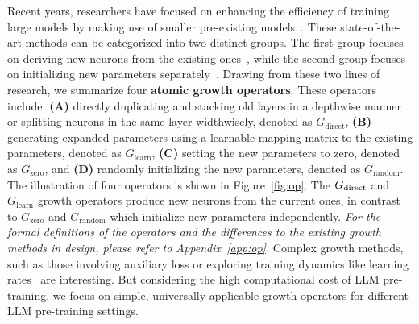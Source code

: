 \documentclass{article}
\begin{document}
Recent years, researchers have focused on enhancing the efficiency of training large models by making use of smaller pre-existing models~\cite{chen2015net2net, chen2021bert2bert, gong2019efficient, yang2020progressively, wang2023learning, wang2023lemon, shen2022staged, evci2022gradmax, yao2024masked}.
These state-of-the-art methods can be categorized into two distinct groups. The first group focuses on deriving new neurons from the existing ones~\cite{chen2015net2net, chen2021bert2bert, gong2019efficient, wang2023lemon, wang2023learning}, while the second group focuses on initializing new parameters separately~\cite{yang2020progressively, shen2022staged, evci2022gradmax, yao2024masked}.
Drawing from these two lines of research, we summarize four \textbf{atomic growth operators}. 
These operators include: \textbf{(A)} directly duplicating and stacking old layers in a depthwise manner or splitting neurons in the same layer widthwisely, denoted as $G_\text{direct}$, \textbf{(B)} generating expanded parameters using a learnable mapping matrix to the existing parameters, denoted as $G_{\text{learn}}$, \textbf{(C)} setting the new parameters to zero, denoted as $G_{\text{zero}}$, and \textbf{(D)} randomly initializing the new parameters, denoted as $G_{\text{random}}$. 
The illustration of four operators is shown in Figure~\ref{fig:op}. The $G_\text{\text{direct}}$ and $G_{\text{learn}}$ growth operators produce new neurons from the current ones, in contrast to $G_{\text{zero}}$ and $G_{\text{random}}$ which initialize new parameters independently.
\textit{For the formal definitions of the operators and the differences to the existing growth methods in design, please refer to Appendix~\ref{app:op}.}
Complex growth methods, such as those involving auxiliary loss or exploring training dynamics like learning rates~\cite{wu2021firefly, yuan2023accelerated, evci2022gradmax} are interesting. But considering the high computational cost of LLM pre-training, we focus on simple, universally applicable growth operators for different LLM pre-training settings.
\end{document}
